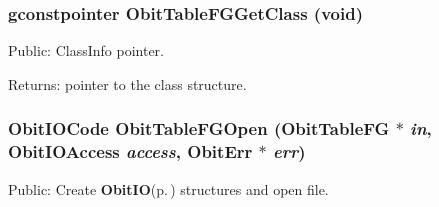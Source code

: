\subsubsection{\setlength{\rightskip}{0pt plus 5cm}gconstpointer Obit\-Table\-FGGet\-Class (void)}\label{ObitTableFG_8h_a13}


Public: Class\-Info pointer. 

\begin{Desc}
\item[Returns:]pointer to the class structure. \end{Desc}
\subsubsection{\setlength{\rightskip}{0pt plus 5cm}Obit\-IOCode Obit\-Table\-FGOpen ({\bf Obit\-Table\-FG} $\ast$ {\em in}, Obit\-IOAccess {\em access}, {\bf Obit\-Err} $\ast$ {\em err})}\label{ObitTableFG_8h_a17}


Public: Create {\bf Obit\-IO}{\rm (p.\,\pageref{structObitIO})} structures and open file. 


